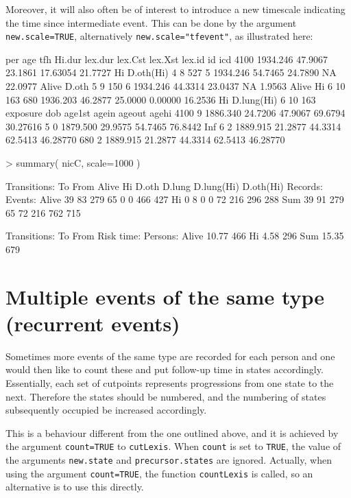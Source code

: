 \documentclass[a4paper,twoside,12pt]{article}
\begin{document}
Moreover, it will also often be of interest to introduce a new
timescale indicating the time since intermediate event. This can be
done by the argument \texttt{new.scale=TRUE}, alternatively
\texttt{new.scale="tfevent"}, as illustrated here:
\begin{Schunk}
\begin{Soutput}
          per     age     tfh   Hi.dur lex.dur lex.Cst    lex.Xst lex.id id icd
4100 1934.246 47.9067 23.1861 17.63054 21.7727      Hi  D.oth(Hi)      4  8 527
5    1934.246 54.7465 24.7890       NA 22.0977   Alive      D.oth      5  9 150
6    1934.246 44.3314 23.0437       NA  1.9563   Alive         Hi      6 10 163
680  1936.203 46.2877 25.0000  0.00000 16.2536      Hi D.lung(Hi)      6 10 163
     exposure      dob  age1st   agein  ageout    agehi
4100        9 1886.340 24.7206 47.9067 69.6794 30.27616
5           0 1879.500 29.9575 54.7465 76.8442      Inf
6           2 1889.915 21.2877 44.3314 62.5413 46.28770
680         2 1889.915 21.2877 44.3314 62.5413 46.28770
\end{Soutput}
\begin{Sinput}
> summary( nicC, scale=1000 )
\end{Sinput}
\begin{Soutput}
Transitions:
     To
From    Alive Hi D.oth D.lung D.lung(Hi) D.oth(Hi)  Records:  Events:
  Alive    39 83   279     65          0         0       466      427
  Hi        0  8     0      0         72       216       296      288
  Sum      39 91   279     65         72       216       762      715
       
Transitions:
     To
From    Risk time:  Persons:
  Alive      10.77       466
  Hi          4.58       296
  Sum        15.35       679
\end{Soutput}
\end{Schunk}

\section{Multiple events of the same type (recurrent events)}
Sometimes more events of the same type are recorded for each person and
one would then like to count these and put follow-up time in states accordingly.
Essentially, each set of cutpoints represents progressions from one
state to the next. Therefore the states should be numbered, and the
numbering of states subsequently occupied be increased accordingly.

This is a behaviour different from the one outlined above, and it is
achieved by the argument \texttt{count=TRUE} to
\texttt{cutLexis}. When \texttt{count} is set to \texttt{TRUE}, the
value of the arguments \texttt{new.state} and
\texttt{precursor.states} are ignored.  Actually, when using the
argument \texttt{count=TRUE}, the function \texttt{countLexis} is
called, so an alternative is to use this directly.
\end{document}
